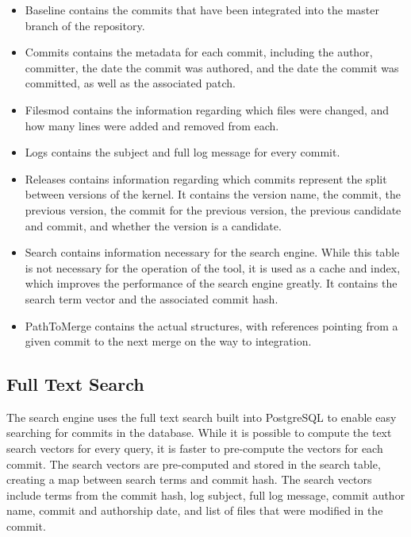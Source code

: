 \begin{itemize}
  \item

    Baseline contains the commits that have been integrated into the
    master branch of the repository.

  \item

    Commits contains the metadata for each commit, including the author,
    committer, the date the commit was authored, and the date the commit
    was committed, as well as the associated patch.

  \item

    Filesmod contains the information regarding which files were changed,
    and how many lines were added and removed from each.

  \item

    Logs contains the subject and full log message for every commit.

  \item

    Releases contains information regarding which commits represent the
    split between versions of the kernel. It contains the version name,
    the commit, the previous version, the commit for the previous
    version, the previous candidate and commit, and whether the version
    is a candidate.

  \item

    Search contains information necessary for the search engine. While
    this table is not necessary for the operation of the tool, it is
    used as a cache and index, which improves the performance of the
    search engine greatly. It contains the search term vector and the
    associated commit hash.

  \item

    PathToMerge contains the actual \mt{} structures, with
    references pointing from a given commit to the next merge on the way
    to integration.

\end{itemize}

\subsection{Full Text Search}\label{sub:full_text_search}

The search engine uses the full text search built into PostgreSQL to
enable easy searching for commits in the database. While it is possible
to compute the text search vectors for every query, it is faster to
pre-compute the vectors for each commit. The search vectors are
pre-computed and stored in the search table, creating a map between
search terms and commit hash. The search vectors include terms from the
commit hash, log subject, full log message, commit author name, commit
and authorship date, and list of files that were modified in the commit.

